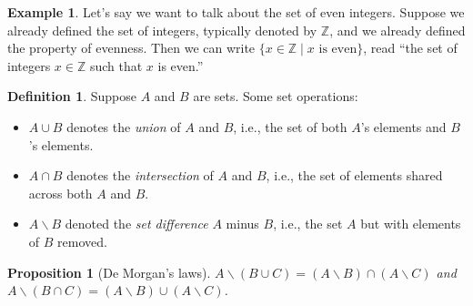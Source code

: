 \documentclass[11pt]{article}
\newtheorem{prop}[thm]{Proposition}
\theoremstyle{definition}
\newtheorem{definition}[thm]{Definition}
\newtheorem{example}[thm]{Example}
\theoremstyle{remark}
\begin{document}
\begin{example}
    Let's say we want to talk about the set of even integers. Suppose we already defined the set of integers, typically denoted by $\mathbb{Z}$, and we already defined the property of evenness. Then we can write $\{x \in \mathbb{Z} \mid x \text{ is even}\}$, read ``the set of integers $x \in \mathbb{Z}$ such that $x$ is even.''
\end{example}

\begin{definition}
    Suppose $A$ and $B$ are sets. Some set operations:
    \begin{itemize}
        \item $A \cup B$ denotes the \emph{union} of $A$ and $B$, i.e., the set of both $A$'s elements and $B$'s elements.
        \item $A \cap B$ denotes the \emph{intersection} of $A$ and $B$, i.e., the set of elements shared across both $A$ and $B$.
        \item $A \smallsetminus B$ denoted the \emph{set difference} $A$ minus $B$, i.e., the set $A$ but with elements of $B$ removed.
    \end{itemize}
\end{definition}

\begin{prop}[De Morgan's laws]
    $A \smallsetminus (B \cup C) = (A \smallsetminus B) \cap (A \smallsetminus C)$ and $A \smallsetminus (B \cap C) = (A \smallsetminus B) \cup (A \smallsetminus C)$.
\end{prop}
\end{document}
